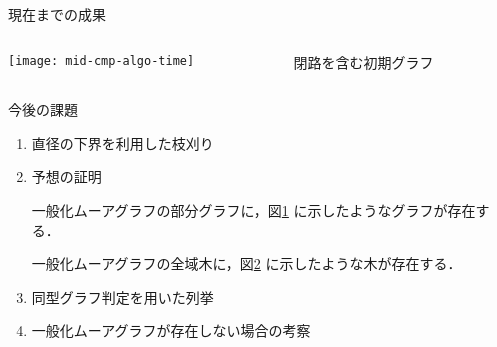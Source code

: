 \begin{frame}{現在までの成果}
  \begin{columns}
    \begin{column}{.6\textwidth}
      \centering
      \texttt{[image: mid-cmp-algo-time]}
      \label{fig:result}
    \end{column}
    \begin{column}{.4\textwidth}
      \centering
      \begin{figure}
        \centering
        \def\svgwidth{\textwidth}
        \resizebox{!}{.3\textheight}{
          
        }
        \caption{閉路を含む初期グラフ}
        \label{fig:initial-graph-cycle}
      \end{figure}
      \vspace{-2em}
      \begin{figure}
        \def\svgwidth{\textwidth}
        \resizebox{!}{.3\textheight}{
          
        }
        \label{fig:initial-graph-stree}
      \end{figure}
    \end{column}
  \end{columns}
\end{frame}

\begin{frame}{今後の課題}
  \begin{enumerate}
  \item 直径の下界を利用した枝刈り
  \item 予想の証明
    \begin{conj}
      一般化ムーアグラフの部分グラフに，図\ref{fig:initial-graph-cycle}
      に示したようなグラフが存在する．
    \end{conj}
    \begin{conj}
      一般化ムーアグラフの全域木に，図\ref{fig:initial-graph-stree}
      に示したような木が存在する．
    \end{conj}
  \item 同型グラフ判定を用いた列挙
  \item 一般化ムーアグラフが存在しない場合の考察
  \end{enumerate}
\end{frame}

